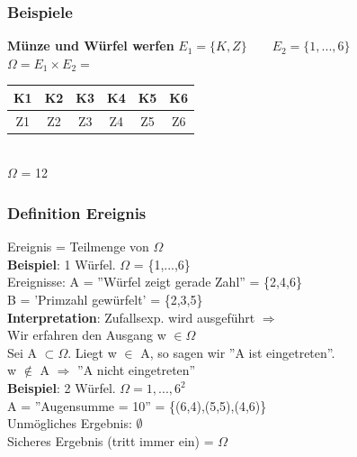 \subsubsection{Beispiele}
\textbf{Münze und Würfel werfen}
$E_1 = \{K,Z\} \qquad E_2 = \{1,...,6\}$\\
$\Omega = E_1 \times E_2 = $\begin{tabular}{|c|c|c|c|c|c|}
	\hline 
K1	&K2  &K3  &K4  &K5  &K6  \\ 
	\hline 
Z1	& Z2 & Z3 &Z4  &Z5  &Z6  \\ 
	\hline 
\end{tabular} \\
 $\Omega$ = 12
\subsubsection{Definition Ereignis}
Ereignis = Teilmenge von $\Omega$\\
\textbf{Beispiel}: 1 Würfel. $\Omega$ = \{1,...,6\}\\
Ereignisse: A = ''Würfel zeigt gerade Zahl'' = \{2,4,6\}\\
B = 'Primzahl gewürfelt' = \{2,3,5\}\medskip\\
\textbf{Interpretation}: Zufallsexp. wird ausgeführt $\Rightarrow$ \\
Wir erfahren den Ausgang w $\in \Omega$\\
Sei A $\subset \Omega$. Liegt w $\in$ A, so sagen wir ''A ist eingetreten''. \\
w $\notin$ A $\Rightarrow$ ''A nicht eingetreten''\medskip\\
\textbf{Beispiel}: 2 Würfel. $\Omega = {1,...,6}^2$\\
A = ''Augensumme  = 10'' = \{(6,4),(5,5),(4,6)\}\medskip\\
Unmögliches Ergebnis: $\emptyset$\\
Sicheres Ergebnis (tritt immer ein) = $\Omega$\newpage
